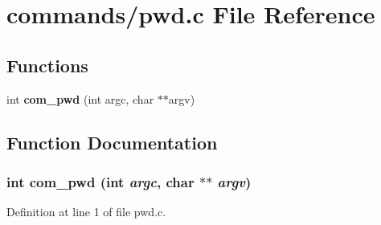 \section{commands/pwd.c File Reference}
\label{pwd_8c}
\subsection*{Functions}
\begin{DoxyCompactItemize}
\item 
int {\bf com\_\-pwd} (int argc, char $\ast$$\ast$argv)
\end{DoxyCompactItemize}


\subsection{Function Documentation}
\subsubsection[{com\_\-pwd}]{\setlength{\rightskip}{0pt plus 5cm}int com\_\-pwd (int {\em argc}, \/  char $\ast$$\ast$ {\em argv})}\label{pwd_8c_a14c73f4f5860e25a2cea1f94f7648702}


Definition at line 1 of file pwd.c.

